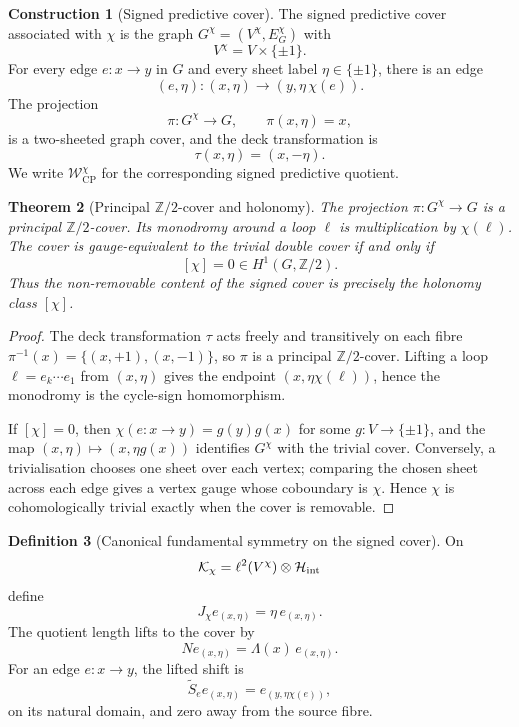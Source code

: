 \documentclass[11pt]{article}
\newtheorem{theorem}{Theorem}[section]
\theoremstyle{definition}
\newtheorem{definition}[theorem]{Definition}
\newtheorem{construction}[theorem]{Construction}
\theoremstyle{remark}
\newcommand{\Z}{\mathbb{Z}}
\newcommand{\Hh}{\mathcal{H}}
\newcommand{\Kh}{\mathcal{K}}
\newcommand{\W}{\mathcal{W}}
\newcommand{\CP}{\mathrm{CP}}
\begin{document}
\begin{construction}[Signed predictive cover]
\label{constr:signed-cover}
The signed predictive cover associated with $\chi$ is the graph
$G^\chi=(V^\chi,E_G^\chi)$ with
\[
  V^\chi=V\times\{\pm1\}.
\]
For every edge $e:x\to y$ in $G$ and every sheet label $\eta\in\{\pm1\}$,
there is an edge
\[
  (e,\eta):(x,\eta)\longrightarrow (y,\eta\,\chi(e)).
\]
The projection
\[
  \pi:G^\chi\longrightarrow G,\qquad \pi(x,\eta)=x,
\]
is a two-sheeted graph cover, and the deck transformation is
\[
  \tau(x,\eta)=(x,-\eta).
\]
We write $\W_{\CP}^{\chi}$ for the corresponding signed predictive quotient.
\end{construction}

\begin{theorem}[Principal $\Z/2$-cover and holonomy]
\label{thm:cover}
The projection $\pi:G^\chi\to G$ is a principal $\Z/2$-cover.  Its monodromy
around a loop $\ell$ is multiplication by $\chi(\ell)$.  The cover is
gauge-equivalent to the trivial double cover if and only if
\[
  [\chi]=0\in H^1(G,\Z/2).
\]
Thus the non-removable content of the signed cover is precisely the holonomy
class $[\chi]$.
\end{theorem}

\begin{proof}
The deck transformation $\tau$ acts freely and transitively on each fibre
$\pi^{-1}(x)=\{(x,+1),(x,-1)\}$, so $\pi$ is a principal $\Z/2$-cover.  Lifting
a loop $\ell=e_k\cdots e_1$ from $(x,\eta)$ gives the endpoint
$(x,\eta\chi(\ell))$, hence the monodromy is the cycle-sign homomorphism.

If $[\chi]=0$, then $\chi(e:x\to y)=g(y)g(x)$ for some
$g:V\to\{\pm1\}$, and the map $(x,\eta)\mapsto (x,\eta g(x))$ identifies
$G^\chi$ with the trivial cover.  Conversely, a trivialisation chooses one
sheet over each vertex; comparing the chosen sheet across each edge gives a
vertex gauge whose coboundary is $\chi$.  Hence $\chi$ is cohomologically
trivial exactly when the cover is removable.
\end{proof}

\begin{definition}[Canonical fundamental symmetry on the signed cover]
\label{def:J-eps}
On
\[
  \Kh_\chi=\ell^2(V^\chi)\otimes\Hh_{\rm int}
\]
define
\[
  J_\chi e_{(x,\eta)}=\eta\,e_{(x,\eta)}.
\]
The quotient length lifts to the cover by
\[
  N e_{(x,\eta)}=\Lambda(x)\,e_{(x,\eta)}.
\]
For an edge $e:x\to y$, the lifted shift is
\[
  \widetilde S_e e_{(x,\eta)}=e_{(y,\eta\chi(e))},
\]
on its natural domain, and zero away from the source fibre.
\end{definition}
\end{document}
